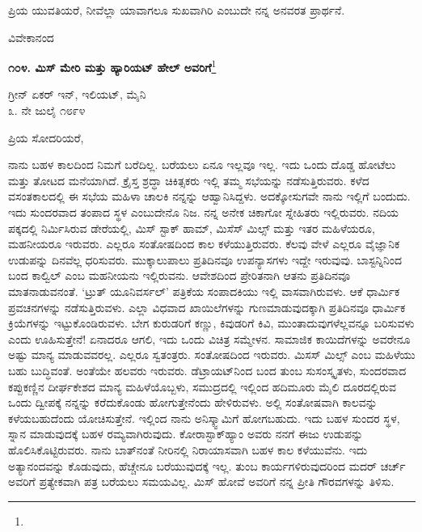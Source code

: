 ಪ್ರಿಯ ಯುವತಿಯರೆ, ನೀವೆಲ್ಲಾ ಯಾವಾಗಲೂ ಸುಖವಾಗಿರಿ ಎಂಬುದೇ ನನ್ನ ಅನವರತ ಪ್ರಾರ್ಥನೆ.
\vspace{-0.4cm}

{\flushright
ವಿವೇಕಾನಂದ\par}
\vspace{-0.3cm}

\begin{center}
\textbf{೧೦೪. ಮಿಸ್ ಮೇರಿ ಮತ್ತು ಹ್ಯಾರಿಯಟ್ ಹೇಲ್‌ ಅವರಿಗೆ}\footnote{}
\end{center}
\vspace{-0.5cm}

\begin{flushright}
ಗ್ರೀನ್ ಏಕರ್‌ ಇನ್‌, ಇಲಿಯಟ್, ಮೈನಿ\\೩. ನೇ ಜುಲೈ ೧೮೯೪
\end{flushright}
\vspace{-0.4cm}

\noindent
ಪ್ರಿಯ ಸೋದರಿಯರೆ,

ನಾನು ಬಹಳ ಕಾಲದಿಂದ ನಿಮಗೆ ಬರೆದಿಲ್ಲ. ಬರೆಯಲು ಏನೂ ಇಲ್ಲವೂ ಇಲ್ಲ. ಇದು ಒಂದು ದೊಡ್ಡ ಹೋಟೆಲು ಮತ್ತು ತೋಟದ ಮನೆಯಾಗಿದೆ. ಕ್ರೈಸ್ತ ಶ್ರದ್ಧಾ ಚಿಕಿತ್ಸಕರು  ಇಲ್ಲಿ ತಮ್ಮ ಸಭೆಯನ್ನು ನಡೆಸುತ್ತಿರುವರು. ಕಳೆದ ವಸಂತಕಾಲದಲ್ಲಿ ಈ ಸಭೆಯ ಮಹಿಳಾ ಚಾಲಕಿ ನನ್ನನ್ನು ಆಹ್ವಾನಿಸಿದ್ದಳು. ಅದಕ್ಕೋಸುಗವೇ ನಾನು ಇಲ್ಲಿಗೆ ಬಂದುದು. ಇದು ಸುಂದರವಾದ ತಂಪಾದ ಸ್ಥಳ ಎಂಬುದೇನೊ ನಿಜ. ನನ್ನ ಅನೇಕ ಚಿಕಾಗೋ ಸ್ನೇಹಿತರು ಇಲ್ಲಿರುವರು. ನದಿಯ ಪಕ್ಕದಲ್ಲಿ ನಿರ್ಮಿಸಿರುವ ಡೇರೆಯಲ್ಲಿ, ಮಿಸ್ ಸ್ಟಾಕ್ ಹಾಮ್, ಮಿಸೆಸ್ ಮಿಲ್ಸ್ ಮತ್ತು ಇತರ ಮಹಿಳೆಯರೂ, ಮಹನೀಯರೂ ಇರುವರು. ಎಲ್ಲರೂ ಸಂತೋಷದಿಂದ ಕಾಲ ಕಳೆಯುತ್ತಿರುವರು. ಕೆಲವು ವೇಳೆ ಎಲ್ಲರೂ ವೈಜ್ಞಾನಿಕ ಉಡುಪನ್ನು ದಿನವೆಲ್ಲ ಧರಿಸುವರು. ಮುಕ್ಕಾಲುಪಾಲು ಪ್ರತಿದಿನವೂ ಉಪನ್ಯಾಸಗಳು ಇದ್ದೇ ಇರುವುವು. ಬಾಸ್ಟನ್ನಿನಿಂದ ಬಂದ ಕಾಲ್ವಿಲ್ ಎಂಬ ಮಹನೀಯನು ಇಲ್ಲಿರುವನು. ಆವೇಶದಿಂದ ಪ್ರೇರಿತನಾಗಿ ಆತನು ಪ್ರತಿದಿನವೂ ಮಾತನಾಡುವನಂತೆ. ‘ಟ್ರುತ್ ಯೂನಿವರ್ಸಲ್’ ಪತ್ರಿಕೆಯ ಸಂಪಾದಕಿಯು ಇಲ್ಲಿ ವಾಸವಾಗಿರುವಳು. ಆಕೆ ಧಾರ್ಮಿಕ ಪ್ರವಚನಗಳನ್ನು ನಡೆಸುತ್ತಿರುವಳು. ಎಲ್ಲಾ ವಿಧವಾದ ಖಾಯಿಲೆಗಳನ್ನು ಗುಣಮಾಡುವುದಕ್ಕಾಗಿ ಪ್ರತಿದಿನವೂ ಧಾರ್ಮಿಕ ಕ್ರಿಯೆಗಳನ್ನು ಇಟ್ಟುಕೊಂಡಿರುವಳು. ಬೇಗ ಕುರುಡರಿಗೆ ಕಣ್ಣು, ಕಿವುಡರಿಗೆ ಕಿವಿ, ಮುಂತಾದುವುಗಳೆಲ್ಲವನ್ನೂ ಬರಿಸುವಳು ಎಂದು ಊಹಿಸುತ್ತೇನೆ! ಏನಾದರೂ ಆಗಲಿ, ಇದು ಒಂದು ವಿಚಿತ್ರ ಸಮ್ಮೇಳನ. ಸಾಮಾಜಿಕ ಕಾಯಿದೆಗಳನ್ನು ಅವರೇನೂ ಅಷ್ಟು ಮಾನ್ಯ ಮಾಡುವವರಲ್ಲ. ಎಲ್ಲರೂ ಸ್ವತಂತ್ರರು. ಸಂತೋಷದಿಂದ ಇರುವರು. ಮಿಸಸ್ ಮಿಲ್ಸ್ ಎಂಬ ಮಹಿಳೆಯು ಬಹು ಬುದ್ಧಿವಂತೆ. ಅಂತೆಯೇ ಹಲವರು ಇರುವರು. ಡೆಟ್ರಾಯಟ್‌ನಿಂದ ಬಂದ ತುಂಬ ಸುಸಂಸ್ಕೃತಳು, ಸುಂದರವಾದ ಕಪ್ಪುಕಣ್ಣಿನ ದೀರ್ಘಕೇಶದ ಮಾನ್ಯ ಮಹಿಳೆಯೊಬ್ಬಳು, ಸಮುದ್ರದಲ್ಲಿ ಇಲ್ಲಿಂದ ಹದಿಮೂರು ಮೈಲಿ ದೂರದಲ್ಲಿರುವ ಒಂದು ದ್ವೀಪಕ್ಕೆ ನನ್ನನ್ನು ಕರೆದುಕೊಂಡು ಹೋಗುತ್ತೇನೆಂದು ಹೇಳಿರುವಳು. ಅಲ್ಲಿ ಸಂತೋಷವಾಗಿ ಕಾಲವನ್ನು ಕಳೆಯಬಹುದೆಂದು ಯೋಚಿಸುತ್ತೇನೆ. ಇಲ್ಲಿಂದ ನಾನು ಅನಿಸ್ಕ್ವಾಮಿಗೆ ಹೋಗಬಹುದು. ಇದು ಬಹಳ ಸುಂದರ ಸ್ಥಳ, ಸ್ನಾನ ಮಾಡುವುದಕ್ಕೆ ಬಹಳ ರಮ್ಯವಾಗಿರುವುದು. ಕೋರಾಸ್ಟಾಕ್‌ಹ್ಯಾಂ ಅವರು ನನಗೆ ಈಜು ಉಡುಪನ್ನು ಹೊಲಿಸಿಕೊಟ್ಟಿರುವರು. ನಾನು ಬಾತ್‌ನಂತೆ ನೀರಿನಲ್ಲಿ ನಿರಾಯಾಸವಾಗಿ ಬಹಳ ಕಾಲ ಕಳೆಯುವೆನು. ಇದು ಅತ್ಯಾನಂದವನ್ನು ಕೊಡುವುದು, ಹೆಚ್ಚೇನೂ ಬರೆಯುವುದಕ್ಕೆ ಇಲ್ಲ. ತುಂಬ ಕಾರ್ಯಗಳಿರುವುದರಿಂದ ಮದರ್ ಚರ್ಚ್ ಅವರಿಗೆ ಪ್ರತ್ಯೇಕವಾಗಿ ಪತ್ರ ಬರೆಯಲು ಸಮಯವಿಲ್ಲ. ಮಿಸ್ ಹೋವೆ ಅವರಿಗೆ ನನ್ನ ಪ್ರೀತಿ ಗೌರವಗಳನ್ನು ತಿಳಿಸು.

